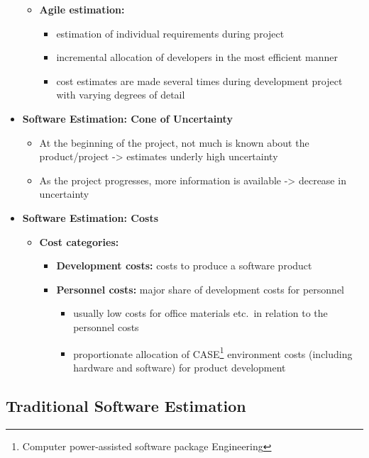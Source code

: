 \documentclass[ieeetran]{article}
\begin{document}
\begin{itemize}
\begin{itemize}
\item \textbf{Agile estimation:}
	\begin{itemize}
	  \item estimation of individual requirements during project
	\item incremental allocation of developers in the most efficient manner
	\item cost estimates are made several times during development project with varying degrees of detail
	\end{itemize}
\end{itemize}
\item \textbf{Software Estimation: Cone of Uncertainty}
	\begin{itemize}
	  \item At the beginning of the project, not much is known about the product/project -> estimates underly high uncertainty
		  \item As the project progresses, more information is available -> decrease in uncertainty
	\end{itemize}
\item \textbf{Software Estimation: Costs}
	\begin{itemize}
	  \item \textbf{Cost categories:}
		  \begin{itemize}
		    \item \textbf{Development costs:} costs to produce a software product
			\item \textbf{Personnel costs:} major share of development costs for personnel
				\begin{itemize}
				  \item usually low costs for office materials etc.\ in relation to the personnel costs
				  \item proportionate allocation of CASE\footnote{Computer power-assisted software package Engineering} environment costs (including hardware and software) for product development
				\end{itemize}
		  \end{itemize}
	\end{itemize}
\end{itemize}

\subsection{Traditional Software Estimation} %
\label{sub:traditional_software_estimation}
\end{document}
